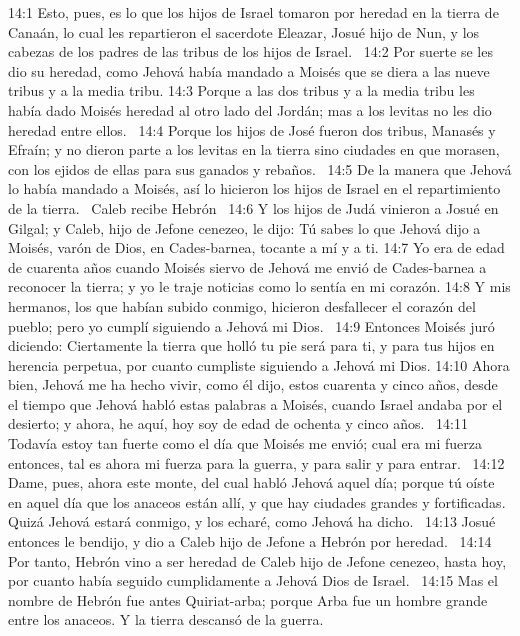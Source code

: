 14:1 Esto, pues, es lo que los hijos de Israel tomaron por heredad en la tierra de Canaán, lo cual les repartieron el sacerdote Eleazar, Josué hijo de Nun, y los cabezas de los padres de las tribus de los hijos de Israel.  
14:2 Por suerte se les dio su heredad, como Jehová había mandado a Moisés que se diera a las nueve tribus y a la media tribu. 
14:3 Porque a las dos tribus y a la media tribu les había dado Moisés heredad al otro lado del Jordán; mas a los levitas no les dio heredad entre ellos.  
14:4 Porque los hijos de José fueron dos tribus, Manasés y Efraín; y no dieron parte a los levitas en la tierra sino ciudades en que morasen, con los ejidos de ellas para sus ganados y rebaños.  
14:5 De la manera que Jehová lo había mandado a Moisés, así lo hicieron los hijos de Israel en el repartimiento de la tierra.  
Caleb recibe Hebrón  
14:6 Y los hijos de Judá vinieron a Josué en Gilgal; y Caleb, hijo de Jefone cenezeo, le dijo: Tú sabes lo que Jehová dijo a Moisés, varón de Dios, en Cades-barnea, tocante a mí y a ti. 
14:7 Yo era de edad de cuarenta años cuando Moisés siervo de Jehová me envió de Cades-barnea a reconocer la tierra; y yo le traje noticias como lo sentía en mi corazón. 
14:8 Y mis hermanos, los que habían subido conmigo, hicieron desfallecer el corazón del pueblo; pero yo cumplí siguiendo a Jehová mi Dios.  
14:9 Entonces Moisés juró diciendo: Ciertamente la tierra que holló tu pie será para ti, y para tus hijos en herencia perpetua, por cuanto cumpliste siguiendo a Jehová mi Dios. 
14:10 Ahora bien, Jehová me ha hecho vivir, como él dijo, estos cuarenta y cinco años, desde el tiempo que Jehová habló estas palabras a Moisés, cuando Israel andaba por el desierto; y ahora, he aquí, hoy soy de edad de ochenta y cinco años.  
14:11 Todavía estoy tan fuerte como el día que Moisés me envió; cual era mi fuerza entonces, tal es ahora mi fuerza para la guerra, y para salir y para entrar.  
14:12 Dame, pues, ahora este monte, del cual habló Jehová aquel día; porque tú oíste en aquel día que los anaceos están allí, y que hay ciudades grandes y fortificadas. Quizá Jehová estará conmigo, y los echaré, como Jehová ha dicho.  
14:13 Josué entonces le bendijo, y dio a Caleb hijo de Jefone a Hebrón por heredad.  
14:14 Por tanto, Hebrón vino a ser heredad de Caleb hijo de Jefone cenezeo, hasta hoy, por cuanto había seguido cumplidamente a Jehová Dios de Israel.  
14:15 Mas el nombre de Hebrón fue antes Quiriat-arba; porque Arba fue un hombre grande entre los anaceos. Y la tierra descansó de la guerra.  
